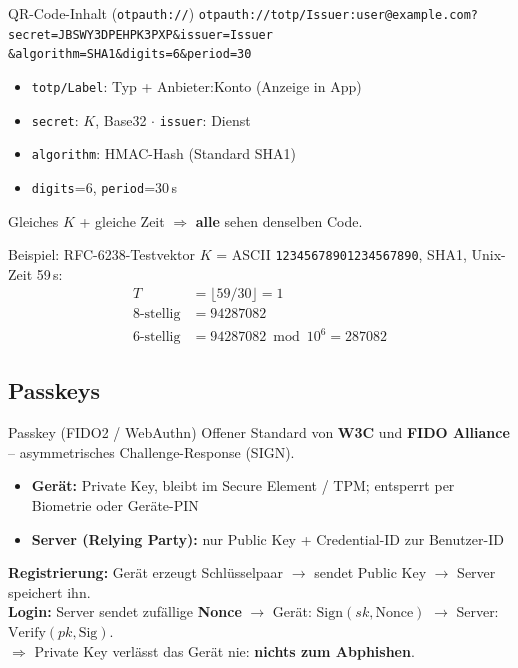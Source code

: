 \documentclass[a4paper, fontsize=7pt]{scrartcl}
\begin{document}
\begin{subbox}{QR-Code-Inhalt (\texttt{otpauth://})}
{\footnotesize\texttt{otpauth://totp/Issuer:user@example.com?\\
secret=JBSWY3DPEHPK3PXP\&issuer=Issuer\\
\&algorithm=SHA1\&digits=6\&period=30}}
\begin{itemize}
    \item \texttt{totp/Label}: Typ + Anbieter:Konto (Anzeige in App)
    \item \texttt{secret}: $K$, Base32 \;$\cdot$\; \texttt{issuer}: Dienst
    \item \texttt{algorithm}: HMAC-Hash (Standard SHA1)
    \item \texttt{digits}=6, \texttt{period}=30\,s
\end{itemize}
Gleiches $K$ + gleiche Zeit $\Rightarrow$ \textbf{alle} sehen denselben Code.
\end{subbox}

\begin{subbox}{Beispiel: RFC-6238-Testvektor}
$K$ = ASCII \texttt{12345678901234567890}, SHA1, Unix-Zeit 59\,s:
\begin{align*}
T &= \lfloor 59/30 \rfloor = 1 \\
\text{8-stellig} &= 94287082 \\
\text{6-stellig} &= 94287082 \bmod 10^6 = 287082
\end{align*}
\end{subbox}

\subsection{Passkeys}

\begin{mainbox}{Passkey (FIDO2 / WebAuthn)}
Offener Standard von \textbf{W3C} und \textbf{FIDO Alliance} --
asymmetrisches Challenge-Response (SIGN).
\begin{itemize}
    \item \textbf{Gerät:} Private Key, bleibt im Secure Element / TPM;
          entsperrt per Biometrie oder Geräte-PIN
    \item \textbf{Server (Relying Party):} nur Public Key + Credential-ID
          zur Benutzer-ID
\end{itemize}
\textbf{Registrierung:} Gerät erzeugt Schlüsselpaar $\to$ sendet Public Key
$\to$ Server speichert ihn.\\
\textbf{Login:} Server sendet zufällige \textbf{Nonce} $\to$ Gerät:
$\mathrm{Sign}(sk, \text{Nonce})$ $\to$ Server:
$\mathrm{Verify}(pk, \text{Sig})$.\\
$\Rightarrow$ Private Key verlässt das Gerät nie: \textbf{nichts zum
Abphishen}.
\end{mainbox}
\end{document}
